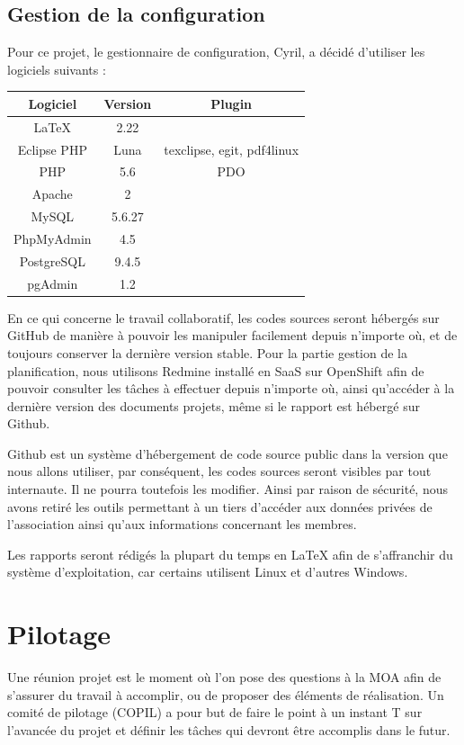 \documentclass[11pt]{report}
\begin{document}
\subsection{Gestion de la configuration}
Pour ce projet, le gestionnaire de configuration, Cyril, a décidé d'utiliser
les logiciels suivants : \\ 
\par 
\begin{tabular}{ | c | c | c | }
\hline 
   Logiciel & Version & Plugin  \\ \hline 
   LaTeX & 2.22 &  \\ \hline
   Eclipse PHP & Luna & texclipse, egit, pdf4linux \\ \hline
   PHP & 5.6 & PDO \\ \hline
   Apache & 2 & \\ \hline
   MySQL & 5.6.27 & \\ \hline
   PhpMyAdmin & 4.5 & \\ \hline
   PostgreSQL & 9.4.5 & \\ \hline
   pgAdmin & 1.2 & \\ \hline
 \end{tabular}
 
 \par En ce qui concerne le travail collaboratif, les codes sources seront
 hébergés sur GitHub de manière à pouvoir les manipuler facilement depuis
 n'importe où, et de toujours conserver la dernière version stable. Pour la
 partie gestion de la planification, nous utilisons Redmine installé en SaaS
 sur OpenShift afin de pouvoir consulter les tâches à effectuer depuis n'importe
 où, ainsi qu'accéder à la dernière version des documents projets, même si le
 rapport est hébergé sur Github.
 \par Github est un système d'hébergement de code source public dans la version 
 que nous allons utiliser, par conséquent, les codes sources seront visibles 
 par tout internaute. Il ne pourra toutefois les modifier. Ainsi par raison de
 sécurité, nous avons retiré les outils permettant à un tiers d'accéder aux
 données privées de l'association ainsi qu'aux informations concernant les
 membres.
 \par Les rapports seront rédigés la plupart du temps en LaTeX afin de
 s'affranchir du système d'exploitation, car certains utilisent Linux et
 d'autres Windows. 

\section{Pilotage}
 Une réunion projet est le moment où l'on pose des questions à la MOA afin de
s'assurer du travail à accomplir, ou de proposer des éléments de réalisation.
 Un comité de pilotage (COPIL) a pour but de faire le point à un instant T sur
l'avancée du projet et définir les tâches qui devront être accomplis dans le 
futur. \\
\end{document}
